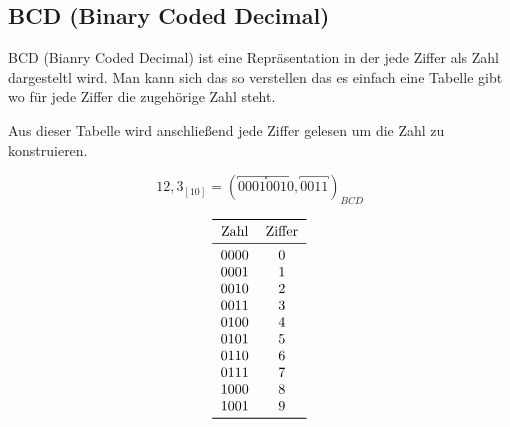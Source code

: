 \documentclass{article}
\begin{document}
\newpage
\subsection{BCD (Binary Coded Decimal)}

BCD (Bianry Coded Decimal) ist eine Repräsentation in der jede Ziffer als Zahl dargesteltl wird.
Man kann sich das so verstellen das es einfach eine Tabelle gibt wo für jede Ziffer die zugehörige Zahl steht.

Aus dieser Tabelle wird anschließend jede Ziffer gelesen um die Zahl zu konstruieren.

\noindent\begin{minipage}{.45\linewidth}
    \begin{equation*}
        12,3_{[10]} = (\overbracket{0001} \overbracket{0010} , \overbracket{0011})_{BCD}
    \end{equation*}
\end{minipage} \begin{minipage}{.45\linewidth}
    \begin{align*}
        \begin{tabular}{cc}
            \toprule
            {Zahl} & {Ziffer} \\
            \midrule
            0000   & 0        \\
            0001   & 1        \\
            0010   & 2        \\
            0011   & 3        \\
            0100   & 4        \\
            0101   & 5        \\
            0110   & 6        \\
            0111   & 7        \\
            1000   & 8        \\
            1001   & 9        \\
            \bottomrule
        \end{tabular}
    \end{align*}
\end{minipage}%
\end{document}

